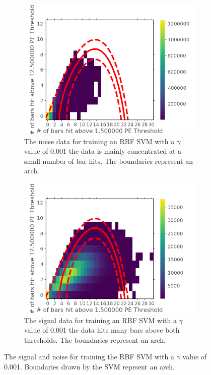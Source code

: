 \begin{figure}[H]
\centering
\begin{subfigure}{.5\textwidth}
  \centering
  \includegraphics[width=\linewidth]{Chapter4/Figs/Raster/svmLinAndRbf/noiseNeutronRbfSVMg0.001.png}
  \captionsetup{width=.9\linewidth}
  \caption{The noise data for training an RBF SVM with a $\gamma$ value of 0.001 the data is mainly concentrated at a small number of bar hits. The boundaries represent an arch.}
  \label{subFig:noiseNeutronRbfSVMg0.001}
\end{subfigure}%
\begin{subfigure}{.5\textwidth}
  \centering
  \includegraphics[width=\linewidth]{Chapter4/Figs/Raster/svmLinAndRbf/signalNeutronRbfSVMg0.001.png}
  \captionsetup{width=.9\linewidth}
  \caption{The signal data for training an RBF SVM with a $\gamma$ value of 0.001 the data hits many bars above both thresholds. The boundaries represent an arch.}
  \label{subFig:signalNeutronRbfSVMg0.001}
\end{subfigure}
\caption{The signal and noise for training the RBF SVM with a $\gamma$ value of 0.001. Boundaries drawn by the SVM reprsent an arch.}
\label{fig:signalAndNoiseNeutronRbfSVMg0.001}
\end{figure}

